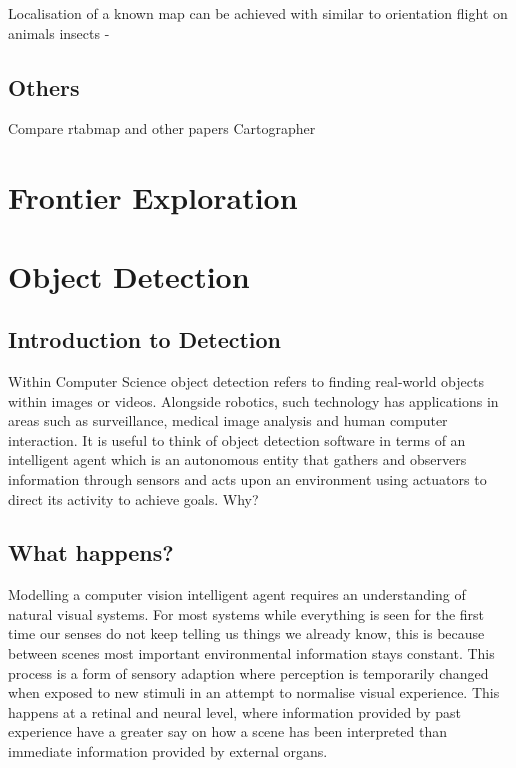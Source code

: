 \documentclass{mproj}
\begin{document}
Localisation of a known map can be achieved with similar to orientation flight on animals insects -

\subsection{Others}

Compare rtabmap and other papers Cartographer

\section{Frontier Exploration}






\section{Object Detection}

\subsection{Introduction to Detection}

Within Computer Science object detection refers to finding real-world objects within images or videos. Alongside robotics, such technology has applications in areas such as surveillance, medical image analysis and human computer interaction. It is useful to think of object detection software in terms of an intelligent agent which is an autonomous entity that gathers and observers information through sensors and acts upon an environment using actuators to direct its activity to achieve goals.\cite{Norvig2003} Why?

\subsection{What happens?}
Modelling a computer vision intelligent agent requires an understanding of natural visual systems. For most systems while everything is seen for the first time our senses do not keep telling us things we already know, this is because between scenes most important environmental information stays constant. This process is a form of sensory adaption where perception is temporarily changed when exposed to new stimuli in an attempt to normalise visual experience.\cite{Webster2015} This happens at a retinal and neural level, where information provided by past experience have a greater say on how a scene has been interpreted than immediate information provided by external organs.
\end{document}
